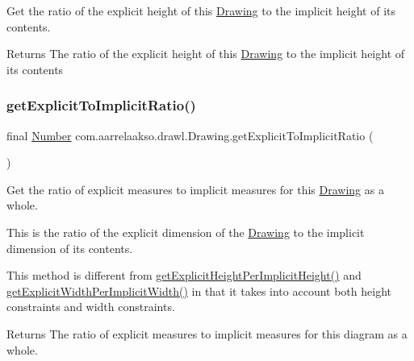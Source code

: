 Get the ratio of the explicit height of this \hyperlink{classcom_1_1aarrelaakso_1_1drawl_1_1_drawing}{Drawing} to the implicit height of its contents. 

\begin{DoxyReturn}{Returns}
The ratio of the explicit height of this \hyperlink{classcom_1_1aarrelaakso_1_1drawl_1_1_drawing}{Drawing} to the implicit height of its contents 
\end{DoxyReturn}
\mbox{\label{classcom_1_1aarrelaakso_1_1drawl_1_1_drawing_a9b47750a4d38fc2db164f0a0cb0e4a42}} 
\subsubsection{\texorpdfstring{get\+Explicit\+To\+Implicit\+Ratio()}{getExplicitToImplicitRatio()}}
{\footnotesize\ttfamily final \hyperlink{interfacecom_1_1aarrelaakso_1_1drawl_1_1_number}{Number} com.\+aarrelaakso.\+drawl.\+Drawing.\+get\+Explicit\+To\+Implicit\+Ratio (\begin{DoxyParamCaption}{ }\end{DoxyParamCaption})\hspace{0.3cm}{\ttfamily [protected]}}



Get the ratio of explicit measures to implicit measures for this \hyperlink{classcom_1_1aarrelaakso_1_1drawl_1_1_drawing}{Drawing} as a whole. 

This is the ratio of the explicit dimension of the \hyperlink{classcom_1_1aarrelaakso_1_1drawl_1_1_drawing}{Drawing} to the implicit dimension of its contents. 

This method is different from \hyperlink{classcom_1_1aarrelaakso_1_1drawl_1_1_drawing_a7e165d3b122c0fd44404c20c1211c21f}{get\+Explicit\+Height\+Per\+Implicit\+Height()} and \hyperlink{classcom_1_1aarrelaakso_1_1drawl_1_1_drawing_afd070929603e97a649a65a888b5f76da}{get\+Explicit\+Width\+Per\+Implicit\+Width()} in that it takes into account both height constraints and width constraints.

\begin{DoxyReturn}{Returns}
The ratio of explicit measures to implicit measures for this diagram as a whole. 
\end{DoxyReturn}
\mbox{\label{classcom_1_1aarrelaakso_1_1drawl_1_1_drawing_a0de258c25c1d13e3c2d71ab6a90606ef}} 

